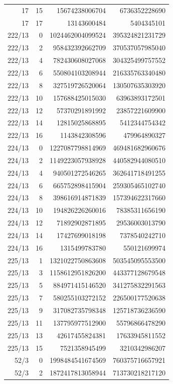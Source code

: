 \begin{longtable}{@{}rrrr@{}}
17 & 15 & 15674238006704 & 6736352228690\\
17 & 17 & 13143600484 & 5404345101\\
222/13 & 0 & 1024462004099524 & 395324821231729\\
222/13 & 2 & 958432392662709 & 370537057985040\\
222/13 & 4 & 782430608027068 & 304325499757552\\
222/13 & 6 & 550804103208944 & 216335763340480\\
222/13 & 8 & 327519726520064 & 130507635303920\\
222/13 & 10 & 157688425015030 & 63963893172501\\
222/13 & 12 & 57370291891992 & 23857221609900\\
222/13 & 14 & 12815025868895 & 5412344754342\\
222/13 & 16 & 1143842308596 & 479964890327\\
224/13 & 0 & 1227087798814969 & 469481682960676\\
224/13 & 2 & 1149223057938928 & 440582944080510\\
224/13 & 4 & 940501272546265 & 362641718491255\\
224/13 & 6 & 665752898415904 & 259305465102740\\
224/13 & 8 & 398616914871839 & 157394622317660\\
224/13 & 10 & 194826226260016 & 78385311656190\\
224/13 & 12 & 71892902871895 & 29536003013790\\
224/13 & 14 & 17427699018198 & 7378540242710\\
224/13 & 16 & 1315499783780 & 550121699974\\
225/13 & 1 & 1321022750863608 & 503545095553500\\
225/13 & 3 & 1158612951826200 & 443377128679548\\
225/13 & 5 & 884971415146520 & 341275832291563\\
225/13 & 7 & 580255103272152 & 226500177520638\\
225/13 & 9 & 317082735798348 & 125718736236590\\
225/13 & 11 & 137795977512900 & 55796866478290\\
225/13 & 13 & 42617455824381 & 17633945811552\\
225/13 & 15 & 7521358945499 & 3210342986207\\
52/3 & 0 & 1998484541674569 & 760375716657921\\
52/3 & 2 & 1872417813058944 & 713730218217120\\

\end{longtable}

